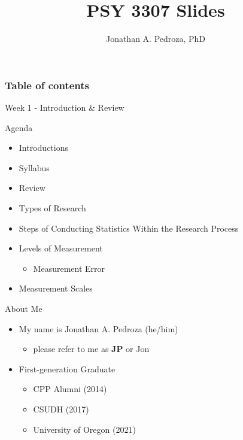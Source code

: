 \documentclass[
  ignorenonframetext,
]{beamer}
\title{PSY 3307 Slides}
\author{Jonathan A. Pedroza, PhD}
\date{}
\providecommand{\tightlist}{%
  \setlength{\itemsep}{0pt}\setlength{\parskip}{0pt}}\usepackage{longtable,booktabs,array}
\renewcommand*\contentsname{Table of contents}
\newcommand\contentsname{Table of contents}
\begin{document}
\frame{\titlepage}

\renewcommand*\contentsname{Table of contents}
\begin{frame}[allowframebreaks]
  \frametitle{Table of contents}
  \setcounter{tocdepth}{3}
  \tableofcontents
\end{frame}

\begin{frame}{Week 1 - Introduction \& Review}
\label{week-1---introduction-review}
\end{frame}

\begin{frame}{Agenda}
\label{agenda}
\begin{itemize}
\tightlist
\item
  Introductions
\item
  Syllabus
\item
  Review
\item
  Types of Research
\item
  Steps of Conducting Statistics Within the Research Process
\item
  Levels of Measurement

  \begin{itemize}
  \tightlist
  \item
    Measurement Error
  \end{itemize}
\item
  Measurement Scales
\end{itemize}
\end{frame}

\begin{frame}{About Me}
\label{about-me}
\begin{itemize}
\tightlist
\item
  My name is Jonathan A. Pedroza (he/him)

  \begin{itemize}
  \tightlist
  \item
    please refer to me as \textbf{JP} or Jon
  \end{itemize}
\item
  First-generation Graduate

  \begin{itemize}
  \tightlist
  \item
    CPP Alumni (2014)
  \item
    CSUDH (2017)
  \item
    University of Oregon (2021)
  \end{itemize}
\end{itemize}
\end{frame}
\end{document}

